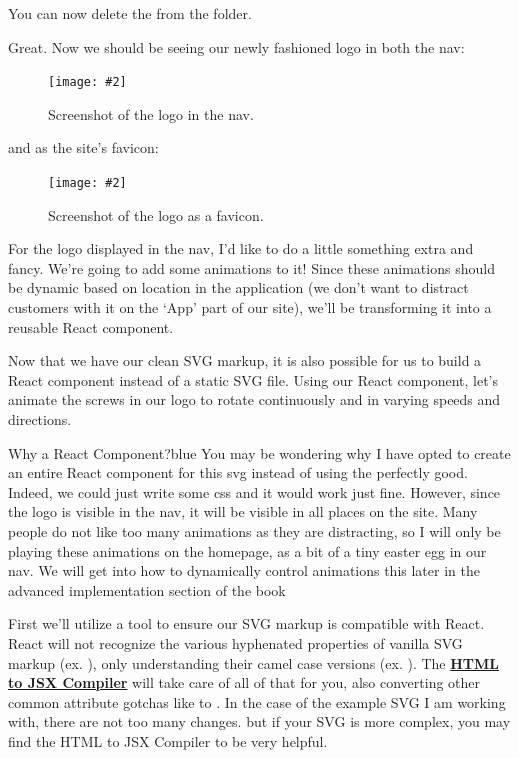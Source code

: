 \documentclass[paper=6in:9in,pagesize=pdftex,headinclude=on,footinclude=on,12pt,twoside]{scrbook}
\newcommand{\link}[2]{\textbf{\textcolor{monokaiPink}{\href{#2}{#1}}}}
\newcommand{\standardfigure}[3]{\begin{figure}[H]\begin{center}\texttt{[image: \#2]}\caption{#3}\label{fig:#2}\end{center}\end{figure}}
\begin{document}
You can now delete the  from the  folder.

Great. Now we should be seeing our newly fashioned logo in both the nav:

\standardfigure{\textwidth/3}{frontend/logo-design/nav-screenshot}{Screenshot of the logo in the nav.}

and as the site's favicon:

\standardfigure{\textwidth/3}{frontend/logo-design/favicon-screenshot}{Screenshot of the logo as a favicon.}

For the logo displayed in the nav, I'd like to do a little something extra and fancy. We're going to add some animations to it! Since these animations should be dynamic based on location in the application (we don't want to distract customers with it on the `App' part of our site), we'll be transforming it into a reusable React component.


Now that we have our clean SVG markup, it is also possible for us to build a React component instead of a static SVG file. Using our React component, let's animate the screws in our logo to rotate continuously and in varying speeds and directions.

\begin{highlightBox}{Why a React Component?}{blue}{\information}
You may be wondering why I have opted to create an entire React component for this svg instead of using the perfectly good. Indeed, we could just write some css and it would work just fine. However, since the logo is visible in the nav, it will be visible in all places on the site. Many people do not like too many animations as they are distracting, so I will only be playing these animations on the homepage, as a bit of a tiny easter egg in our nav. We will get into how to dynamically control animations this later in the advanced implementation section of the book
\end{highlightBox}

First we'll utilize a tool to ensure our SVG markup is compatible with React. React will not recognize the various hyphenated properties of vanilla SVG markup (ex. ), only understanding their camel case versions (ex. ). The \link{HTML to JSX Compiler}{https://magic.reactjs.net/htmltojsx.htm} will take care of all of that for you, also converting other common attribute gotchas like  to . In the case of the example SVG I am working with, there are not too many changes. but if your SVG is more complex, you may find the HTML to JSX Compiler to be very helpful.
\end{document}
